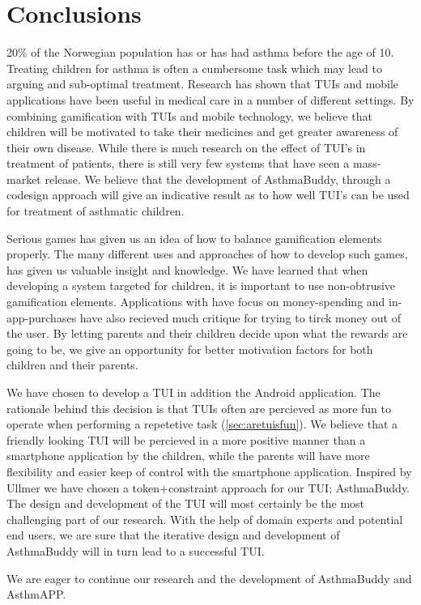 \chapter{Conclusions}
\label{conclusions}

20\% of the Norwegian population has or has had asthma before the age of 10. Treating children for asthma is often a cumbersome task which may lead to arguing and sub-optimal treatment. Research has shown that TUIs and mobile applications have been useful in medical care in a number of different settings. By combining gamification with TUIs and mobile technology, we believe that children will be motivated to take their medicines and get greater awareness of their own disease. While there is much research on the effect of TUI's in treatment of patients, there is still very few systems that have seen a mass-market release. We believe that the development of AsthmaBuddy, through a codesign approach will give an indicative result as to how well TUI's can be used for treatment of asthmatic children.


Serious games has given us an idea of how to balance gamification elements properly. The many different uses and approaches of how to develop such games, has given us valuable insight and knowledge. We have learned that when developing a system targeted for children, it is important to use non-obtrusive gamification elements. Applications with have focus on money-spending and in-app-purchases have also recieved much critique for trying to tirck money out of the user. By letting parents and their children decide upon what the rewards are going to be, we give an opportunity for better motivation factors for both children and their parents. 


We have chosen to develop a TUI in addition the Android application. The rationale behind this decision is that TUIs often are percieved as more fun to operate when performing a repetetive task (\ref{sec:aretuisfun}). We believe that a friendly looking TUI will be percieved in a more positive manner than a smartphone application by the children, while the parents will have more flexibility and easier keep of control with the smartphone application. Inspired by Ullmer \cite{ullmer2002tangible} we have chosen a token+constraint approach for our TUI; AsthmaBuddy. The design and development of the TUI will most certainly be the most challenging part of our research. With the help of domain experts and potential end users, we are sure that the iterative design and development of AsthmaBuddy will in turn lead to a successful TUI. 

We are eager to continue our research and the development of AsthmaBuddy and AsthmAPP. 


